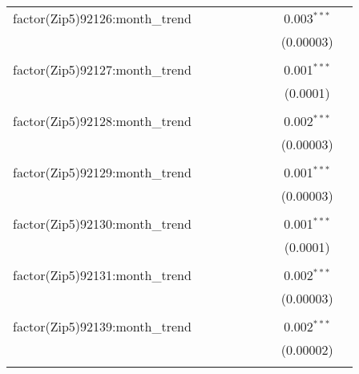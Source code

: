 \begin{table}[H]
{\begin{tabular}{@{\extracolsep{5pt}}lcccccccc}
  factor(Zip5)92126:month\_trend &  &  &  &  &  &  & 0.003$^{***}$ &  \\  

   &  &  &  &  &  &  & (0.00003) &  \\  

   & & & & & & & & \\  

  factor(Zip5)92127:month\_trend &  &  &  &  &  &  & 0.001$^{***}$ &  \\  

   &  &  &  &  &  &  & (0.0001) &  \\  

   & & & & & & & & \\  

  factor(Zip5)92128:month\_trend &  &  &  &  &  &  & 0.002$^{***}$ &  \\  

   &  &  &  &  &  &  & (0.00003) &  \\  

   & & & & & & & & \\  

  factor(Zip5)92129:month\_trend &  &  &  &  &  &  & 0.001$^{***}$ &  \\  

   &  &  &  &  &  &  & (0.00003) &  \\  

   & & & & & & & & \\  

  factor(Zip5)92130:month\_trend &  &  &  &  &  &  & 0.001$^{***}$ &  \\  

   &  &  &  &  &  &  & (0.0001) &  \\  

   & & & & & & & & \\  

  factor(Zip5)92131:month\_trend &  &  &  &  &  &  & 0.002$^{***}$ &  \\  

   &  &  &  &  &  &  & (0.00003) &  \\  

   & & & & & & & & \\  

  factor(Zip5)92139:month\_trend &  &  &  &  &  &  & 0.002$^{***}$ &  \\  

   &  &  &  &  &  &  & (0.00002) &  \\  

   & & & & & & & & \\  


\end{tabular}}
\end{table}

